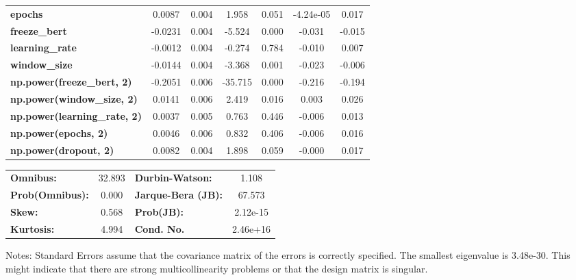 \begin{center}
\begin{tabular}{lcccccc}
\textbf{epochs}                            &       0.0087  &        0.004     &     1.958  &         0.051        &    -4.24e-05    &        0.017     \\
\textbf{freeze\_bert}                      &      -0.0231  &        0.004     &    -5.524  &         0.000        &       -0.031    &       -0.015     \\
\textbf{learning\_rate}                    &      -0.0012  &        0.004     &    -0.274  &         0.784        &       -0.010    &        0.007     \\
\textbf{window\_size}                      &      -0.0144  &        0.004     &    -3.368  &         0.001        &       -0.023    &       -0.006     \\
\textbf{np.power(freeze\_bert, 2)}         &      -0.2051  &        0.006     &   -35.715  &         0.000        &       -0.216    &       -0.194     \\
\textbf{np.power(window\_size, 2)}         &       0.0141  &        0.006     &     2.419  &         0.016        &        0.003    &        0.026     \\
\textbf{np.power(learning\_rate, 2)}       &       0.0037  &        0.005     &     0.763  &         0.446        &       -0.006    &        0.013     \\
\textbf{np.power(epochs, 2)}               &       0.0046  &        0.006     &     0.832  &         0.406        &       -0.006    &        0.016     \\
\textbf{np.power(dropout, 2)}              &       0.0082  &        0.004     &     1.898  &         0.059        &       -0.000    &        0.017     \\
\bottomrule
\end{tabular}
\begin{tabular}{lclc}
\textbf{Omnibus:}       & 32.893 & \textbf{  Durbin-Watson:     } &    1.108  \\
\textbf{Prob(Omnibus):} &  0.000 & \textbf{  Jarque-Bera (JB):  } &   67.573  \\
\textbf{Skew:}          &  0.568 & \textbf{  Prob(JB):          } & 2.12e-15  \\
\textbf{Kurtosis:}      &  4.994 & \textbf{  Cond. No.          } & 2.46e+16  \\
\bottomrule
\end{tabular}
\end{center}

Notes: \newline
 [1] Standard Errors assume that the covariance matrix of the errors is correctly specified. \newline
 [2] The smallest eigenvalue is 3.48e-30. This might indicate that there are \newline
 strong multicollinearity problems or that the design matrix is singular.